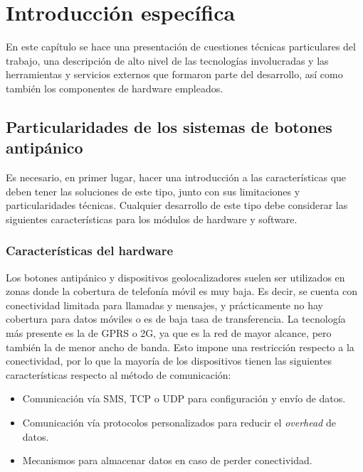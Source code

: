 \chapter{Introducción específica} %

\label{Chapter2}
En este capítulo se hace una presentación de cuestiones técnicas particulares del trabajo, una descripción de alto nivel de las tecnologías involucradas y las herramientas y servicios externos que formaron parte del desarrollo, así como también los componentes de hardware empleados.

\section{Particularidades de los sistemas de botones antipánico}

Es necesario, en primer lugar, hacer una introducción a las características que deben tener las soluciones de este tipo, junto con sus limitaciones y particularidades técnicas. Cualquier desarrollo de este tipo debe considerar las siguientes características para los módulos de hardware y software.

\subsection{Características del hardware}

Los botones antipánico y dispositivos geolocalizadores suelen ser utilizados en zonas donde la cobertura de telefonía móvil es muy baja. Es decir, se cuenta con conectividad limitada para llamadas y mensajes, y prácticamente no hay cobertura para datos móviles o es de baja tasa de transferencia. La tecnología más presente es la de GPRS o 2G\citep{NPERF:1}, ya que es la red de mayor alcance, pero también la de menor ancho de banda.
Esto impone una restricción respecto a la conectividad, por lo que la mayoría de los dispositivos tienen las siguientes características respecto al método de comunicación:
\begin{itemize}
	\item Comunicación vía SMS, TCP o UDP para configuración y envío de datos.
	\item Comunicación vía protocolos personalizados\citep{PROTOCOLS:1} para reducir el \textit{overhead} de datos.
	\item Mecanismos para almacenar datos en caso de perder conectividad.
\end{itemize}

